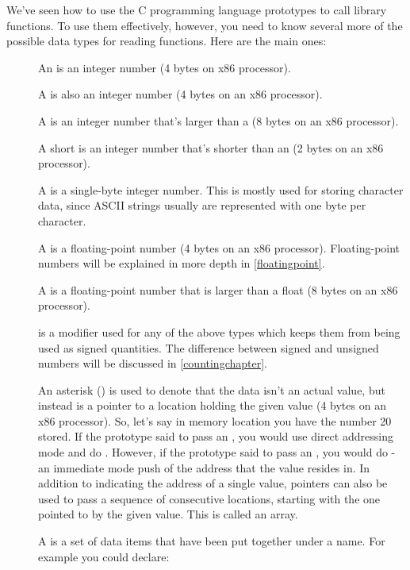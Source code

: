 We've seen how to use the C programming language prototypes to
call library functions.  To use them effectively, however, you need to know 
several more of the possible data types for reading functions.  Here are
the main ones:

\begin{description}
\item[] An  is an integer number (4 bytes on x86 processor).
\item[] A  is also an integer number (4 bytes on an x86 processor).
\item[] A  is an integer number that's larger than a  (8 bytes on an x86 processor).
\item[] A short is an integer number that's shorter than an  (2 bytes on an x86 processor).
\item[] A  is a single-byte integer number.  This is mostly used for storing
character data, since ASCII strings usually are represented with one byte per character.
\item[] A  is a floating-point number (4 bytes on an x86 processor). 
Floating-point numbers will be explained in more depth in \autoref{floatingpoint}.
\item[] A  is a floating-point number that is larger than a float
(8 bytes on an x86 processor).
\item[]  is a modifier used for any of the above types which 
keeps them from being used as signed quantities.  The difference between signed
and unsigned numbers will be discussed in \autoref{countingchapter}.
\item[\icode{*\index{*}}] An asterisk (\icode{*}) is used to denote that the data isn't an actual
value, but instead is a pointer to a location holding the given
value (4 bytes on an x86 processor).  
So, let's say in memory location  you have the number 20 stored.  
If the prototype said to pass an , you would 
use direct addressing mode and do .
However, if the prototype said to pass an ,
you would do  - an immediate mode push of
the address that the value resides in.  In addition to indicating the address of 
a single value, pointers can also be used to
pass a sequence of consecutive locations, starting with the one pointed to by the 
given value.  This is called an array.
\item[] A  is a set of data items that have been put together under
a name.  For example you could declare:


\end{description}
